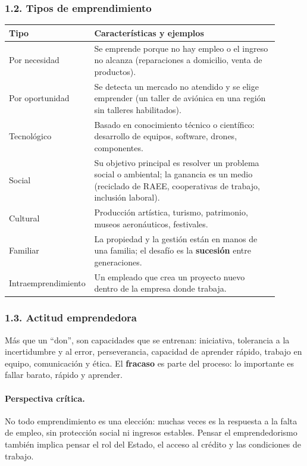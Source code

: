 \subsubsection*{1.2. Tipos de emprendimiento}
\begin{center}
\small
\begin{tabular}{|p{0.22\linewidth}|p{0.68\linewidth}|}
\hline
\textbf{Tipo} & \textbf{Características y ejemplos} \\ \hline
Por necesidad & Se emprende porque no hay empleo o el ingreso no alcanza (reparaciones a
domicilio, venta de productos). \\ \hline
Por oportunidad & Se detecta un mercado no atendido y se elige emprender (un taller de
aviónica en una región sin talleres habilitados). \\ \hline
Tecnológico & Basado en conocimiento técnico o científico: desarrollo de equipos, software,
drones, componentes. \\ \hline
Social & Su objetivo principal es resolver un problema social o ambiental; la ganancia es un
medio (reciclado de RAEE, cooperativas de trabajo, inclusión laboral). \\ \hline
Cultural & Producción artística, turismo, patrimonio, museos aeronáuticos, festivales. \\ \hline
Familiar & La propiedad y la gestión están en manos de una familia; el desafío es la
\textbf{sucesión} entre generaciones. \\ \hline
Intraemprendimiento & Un empleado que crea un proyecto nuevo dentro de la empresa donde
trabaja. \\ \hline
\end{tabular}
\end{center}

\subsubsection*{1.3. Actitud emprendedora}
Más que un ``don'', son capacidades que se entrenan: iniciativa, tolerancia a la
incertidumbre y al error, perseverancia, capacidad de aprender rápido, trabajo en equipo,
comunicación y ética. El \textbf{fracaso} es parte del proceso: lo importante es fallar
barato, rápido y aprender.

\paragraph*{Perspectiva crítica.} No todo emprendimiento es una elección: muchas veces es la
respuesta a la falta de empleo, sin protección social ni ingresos estables. Pensar el
emprendedorismo también implica pensar el rol del Estado, el acceso al crédito y las
condiciones de trabajo.

